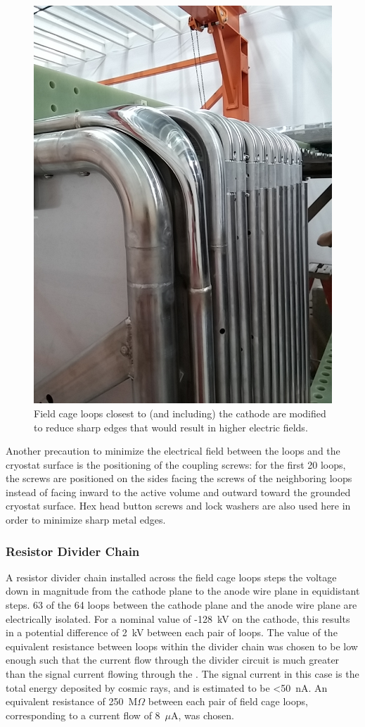 \begin{figure}[htb]
\centering	
\includegraphics[width=0.8\linewidth]{figures/tpc-smooshed-elbow-3.jpg}
\caption{Field cage loops closest to (and including) the cathode are modified to reduce sharp edges that would result in higher electric fields.}
\label{fig:tpc-smooshed-elbow}
\end{figure}

Another precaution to minimize the electrical field between the loops and the cryostat surface is the positioning of the coupling screws: for the first 20 loops, the screws are positioned on the sides facing the screws of the neighboring loops instead of facing inward to the \lartpc active volume and outward toward the grounded cryostat surface. Hex head button screws and lock washers are also used here in order to minimize sharp metal edges.


\subsubsection{Resistor Divider Chain}

A resistor divider chain installed across the field cage loops steps the voltage down in magnitude from the cathode plane to the anode wire plane in equidistant steps. 63 of the 64 loops between the cathode plane and the anode wire plane are electrically isolated.  For a nominal value of -128~kV on the cathode, this results in a potential difference of 2~kV between each pair of loops. The value of the equivalent resistance between loops within the divider chain was chosen to be low enough such that the current flow through the divider circuit is much greater than the signal current flowing through the \lartpc. The signal current in this case is the total energy deposited by cosmic rays, and is estimated to be <50~nA. An equivalent resistance of 250~M$\Omega$ between each pair of field cage loops, corresponding to a current flow of 8~$\mu$A, was chosen.  

